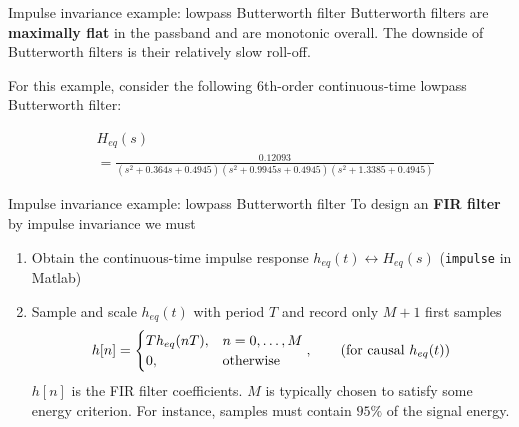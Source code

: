 \documentclass[10pt]{beamer}
\begin{document}
\begin{frame}{Impulse invariance example: lowpass Butterworth filter}
Butterworth filters are \textbf{maximally flat} in the passband and are monotonic overall. The downside of Butterworth filters is their relatively slow roll-off.
\vspace{0.25cm}

For this example, consider the following 6th-order continuous-time lowpass Butterworth filter:

\begin{align*}
&H_{eq}(s)  \\
&= \frac{0.12093}{(s^2 + 0.364s + 0.4945)(s^2 + 0.9945s + 0.4945)(s^2 + 1.3385 + 0.4945)}
\end{align*}

\end{frame}

%
\begin{frame}{Impulse invariance example: lowpass Butterworth filter}
To design an \textbf{FIR filter} by impulse invariance we must
\begin{enumerate}
	\item Obtain the continuous-time impulse response $h_{eq}(t) \longleftrightarrow H_{eq}(s)$ (\texttt{impulse} in Matlab)
	\item Sample and scale $h_{eq}(t)$ with period $T$ and record only $M+1$ first samples 
	\begin{equation*}
		h[n] = \begin{cases}
		Th_{eq}(nT), & n = 0, \ldots, M \\
		0, & \text{otherwise}
		\end{cases}, \tag{for causal $h_{eq}(t)$}
	\end{equation*}
	$h[n]$ is the FIR filter coefficients. $M$ is typically chosen to satisfy some energy criterion. For instance, samples must contain $95\%$ of the signal energy.
\end{enumerate} 
\begin{center}
	\resizebox{0.7\linewidth}{!}{}
\end{center}

\end{frame}
\end{document}
